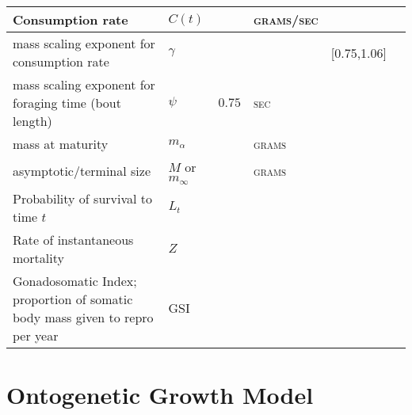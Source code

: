 \documentclass[a4paper]{article} %
\begin{document}
\begin{table}[H]
\begin{tabularx}{\linewidth}{Xlllll}
    Consumption rate                                                                & $C(t)$               &                                & \textsc{grams/sec} &                  &                   \\ \hline
    mass scaling exponent for consumption rate                                      & $\gamma$             &                                & \textsc{}          & [0.75,1.06]      &                   \\ \hline
    mass scaling exponent for foraging time (bout length)                           & $\psi$               & $0.75$                         & \textsc{sec}       &                  &                   \\ \hline
    mass at maturity                                                                & $m_{\alpha}$         &                                & \textsc{grams}     &                  &                   \\ \hline
    asymptotic/terminal size                                                        & $M$ or $m_{\infty}$  &                                & \textsc{grams}     &                  &                   \\ \hline
    Probability of survival to time $t$                                             & $L_t$                &                                & \textsc{}          &                  &                   \\ \hline
    Rate of instantaneous mortality                                                 & $Z$                  &                                & \textsc{}          &                  &                   \\ \hline
    Gonadosomatic Index; proportion of somatic body mass given to repro per year    & GSI                  &                                & \textsc{}          &                  &                   \\ \hline
    \end{tabularx}
\end{table}
\newpage

\section{Ontogenetic Growth Model}
\end{document}
